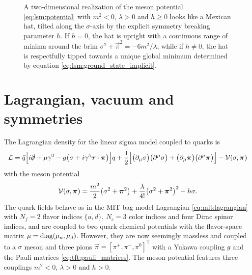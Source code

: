 \begin{figure}
\centering
{}
\caption{\label{fig:lsm:potential}%
	A two-dimensional realization of the meson potential \eqref{eq:lsm:potential} with $m^2<0$, $\lambda>0$ and $h \geq 0$ looks like a Mexican hat, tilted along the $\sigma$-axis by the explicit symmetry breaking parameter $h$.
	If $h = 0$, the hat is upright with a continuous range of minima around the brim $\sigma^2 + \vec\pi^2 = -6m^2 / \lambda$;
	while if $h \neq 0$, the hat is respectfully tipped towards a unique global minimum determined by equation \eqref{eq:lsm:ground_state_implicit}.
}
\end{figure}

\section{Lagrangian, vacuum and symmetries}
\label{sec:lsm:vacuum}

The Lagrangian density for the linear sigma model coupled to quarks is \cite{ref:lsm_2f}
\begin{equation}
	\mathcal{L} = \bar{q} \Big[ i \slashed\partial + \mu \gamma^0 - g \big( \sigma + i \gamma^5 {\bm{\tau}} \cdot {\bm{\pi}} \big) \Big] q
	      + \frac12 \Big[ \big( \partial_\mu \sigma \big) \big( \partial^\mu \sigma \big) + \big( \partial_\mu {\bm{\pi}} \big) \big( \partial^\mu {\bm{\pi}} \big) \Big] - \mathcal{V}(\sigma,{\bm{\pi}})
\label{eq:lsm:lagrangian}
\end{equation}
with the meson potential
\begin{equation}
	\mathcal{V}(\sigma, {\bm{\pi}}) = \frac{m^2}{2} \big( \sigma^2 + {\bm{\pi}}^2 \big) + \frac{\lambda}{4!} \big( \sigma^2 + {\bm{\pi}}^2 \big)^2 - h \sigma .
\label{eq:lsm:potential}
\end{equation}
The quark fields behave as in the MIT bag model Lagrangian \eqref{eq:mit:lagrangian} with $N_f=2$ flavor indices $\{u,d\}$, $N_c=3$ color indices and four Dirac spinor indices, and are coupled to two quark chemical potentials with the flavor-space matrix $\mu = \operatorname{diag} (\mu_u, \mu_d)$.
However, they are now seemingly massless and coupled to a $\sigma$ meson and three pions $\vec\pi = [\pi^+, \pi^-, \pi^0]^\mathsf{T}$ with a Yukawa coupling $g$ and the Pauli matrices \eqref{eq:tft:pauli_matrices}.
The meson potential features three couplings $m^2<0$, $\lambda>0$ and $h>0$.

